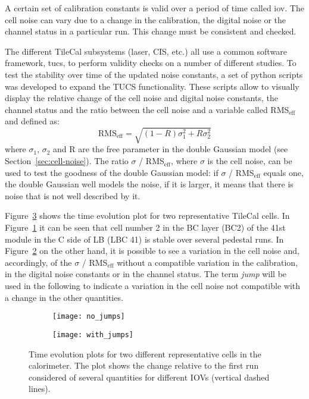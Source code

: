 A certain set of calibration constants is valid over a period of time called
\gls{iov}. The cell noise can vary due to a change in the calibration, the
digital noise or the channel status in a particular run. This change must be
consistent and checked.

The different TileCal subsystems (laser, CIS, etc.) all use a common software
framework, \gls{tucs}, to perform validity checks on a number of different
studies. To test the stability over time of the updated noise constants, a set
of python scripts was developed to expand the TUCS functionality. These scripts
allow to visually display the relative change of the cell noise and digital
noise constants, the channel status and the ratio between the cell noise and a
variable called RMS$_\text{eff}$ and defined as:
\begin{equation}
  \label{eq:73}
  \text{RMS}_{\text{eff}} = \sqrt{(1 - R) \sigma_1^2 + R \sigma_2^2}
\end{equation}
where $\sigma_1$, $\sigma_2$ and R are the free parameter in the double Gaussian
model (see Section~\ref{sec:cell-noise}).  The ratio $\sigma$ /
RMS$_\text{eff}$, where $\sigma$ is the cell noise, can be used to test the
goodness of the double Gaussian model: if $\sigma$ / RMS$_\text{eff}$ equals
one, the double Gaussian well models the noise, if it is larger, it means that
there is noise that is not well described by it.

Figure~\ref{fig:jumps} shows the time evolution plot for two representative
TileCal cells. In Figure~\ref{fig:no_jumps} it can be seen that cell number 2 in
the BC layer (BC2) of the 41st module in the C side of LB (LBC 41) is stable
over several pedestal runs. In Figure~\ref{fig:with_jumps} on the other hand, it
is possible to see a variation in the cell noise and, accordingly, of the
$\sigma$ / RMS$_{\text{eff}}$ without a compatible variation in the calibration,
in the digital noise constants or in the channel status. The term \emph{jump}
will be used in the following to indicate a variation in the cell noise not
compatible with a change in the other quantities.

\begin{figure}[!h]
  \centering
  \begin{subfigure}[t]{.48\linewidth}
    \texttt{[image: no\_jumps]}
    \caption{}
    \label{fig:no_jumps}
  \end{subfigure}
  \begin{subfigure}[t]{.48\linewidth}
    \texttt{[image: with\_jumps]}
    \caption{}
    \label{fig:with_jumps}
  \end{subfigure}
  \caption{Time evolution plots for two different representative cells in the
    calorimeter. The plot shows the change relative to the first run considered
    of several quantities for different IOVs (vertical dashed lines).}
  \label{fig:jumps}
\end{figure}

